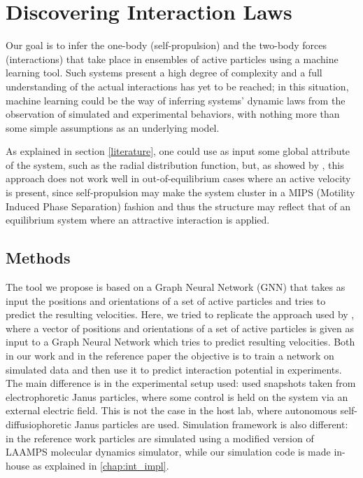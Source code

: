 \documentclass[../../master_thesis_np.tex]{subfiles}
\begin{document}
\chapter{Discovering Interaction Laws}
Our goal is to infer the one-body (self-propulsion) and the two-body forces (interactions) that take place in ensembles of active particles using a machine learning tool.
Such systems present a high degree of complexity and a full understanding of the actual interactions has yet to be reached; in this situation, machine learning could be the way of inferring systems' dynamic laws from the observation of simulated and experimental behaviors, with nothing more than some simple assumptions as an underlying model.

As explained in section \ref{literature}, one could use as input some global attribute of the system, such as the radial distribution function, but, as showed by \citeauthor{bag_interaction_2021}, this approach does not work well in out-of-equilibrium cases where an active velocity is present, since self-propulsion may make the system cluster in a MIPS (Motility Induced Phase Separation) fashion and thus the structure may reflect that of an equilibrium system where an attractive interaction is applied.

\section{Methods}
The tool we propose is based on a Graph Neural Network (GNN) that takes as input the positions and orientations of a set of active particles and tries to predict the resulting velocities.
Here, we tried to replicate the approach used by \citeauthor{ruiz-garcia_discovering_2024}, where a vector of positions and orientations of a set of active particles is given as input to a Graph Neural Network which tries to predict resulting velocities.
Both in our work and in the reference paper the objective is to train a network on simulated data and then use it to predict interaction potential in experiments.
The main difference is in the experimental setup used: \citeauthor{ruiz-garcia_discovering_2024} used snapshots taken from electrophoretic Janus particles, where some control is held on the system via an external electric field.
This is not the case in the host lab, where autonomous self-diffusiophoretic Janus particles are used.
Simulation framework is also different: in the reference work particles are simulated using a modified version of LAAMPS \cite{thompson_lammps_2022} molecular dynamics simulator, while our simulation code is made in-house as explained in \ref{chap:int_impl}.
\end{document}
